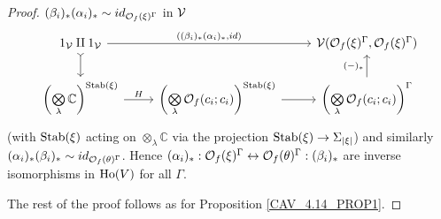 \documentclass[a4paper,10pt
]{article}%
\renewcommand{\1}{\ensuremath{\mathbb{id}}}
\begin{document}
\begin{proof}
      $(\beta_i)_{\**}(\alpha_i)_{\**} \sim id_{\O_f(\ksi)^\Gamma}$ in $\mathcal V$
      \begin{equation}
            \begin{tikzcd}
                  1_\V \amalg 1_\V \arrow[d, tail] \arrow[rr, "{((\beta_i)_{\**}(\alpha_i)_{\**}, id)}"]
                  &&
                  \V(\O_f(\ksi)^\Gamma, \O_f(\ksi)^\Gamma)
                  \\                  
                  \left(\bigotimes\limits_\lambda \mathbb C\right)^{\Stab(\ksi)}
                  \arrow[r, "H"]
                  &
                  \left(\bigotimes\limits_\lambda \O_f(c_i;c_i)\right)^{\Stab(\ksi)} \arrow[r]
                  &
                  \left(\bigotimes\limits_\lambda \O_f(c_i;c_i)\right)^{\Gamma} \arrow[u, "{(-)_{\**}}"]                  
            \end{tikzcd}
      \end{equation}
      (with $\mathrm{Stab}(\xi)$ acting on $\otimes_\lambda \mathbb C$ via the projection $\mathrm{Stab}(\xi) \to \Sigma_{|\xi|}$)
      and similarly $(\alpha_i)_{\**}(\beta_i)_{\**} \sim id_{\O_f(\theta)^\Gamma}$.
      Hence
      $(\alpha_i)_{\**}: \O_f(\ksi)^\Gamma \leftrightarrow \O_f(\theta)^\Gamma: (\beta_i)_{\**}$
      are inverse isomorphisms in $\operatorname{Ho}(V)$ for all $\Gamma$.

      The rest of the proof follows as for Proposition \ref{CAV_4.14_PROP1}.
      

\end{proof}
\end{document}
